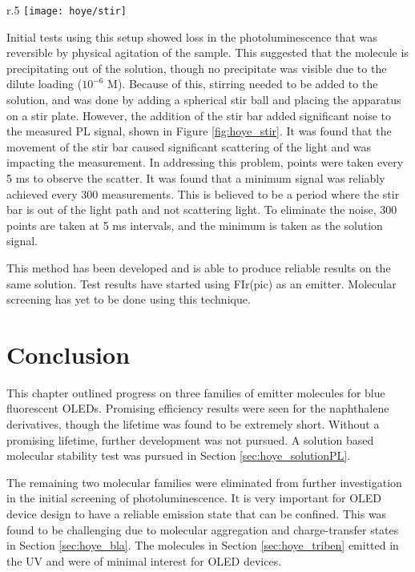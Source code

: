 \documentclass[../thesis.tex]{subfiles}
\begin{document}
\begin{wrapfigure}{r}{.5\textwidth}
\centering
\texttt{[image: hoye/stir]}
\caption{Scatter in signal when stirring.  Despite the noise, notice the constant baseline.}
\label{fig:hoye_stir}
\end{wrapfigure}

Initial tests using this setup showed loss in the photoluminescence that was reversible by physical agitation of the sample.  
This suggested that the molecule is precipitating out of the solution, though no precipitate was visible due to the dilute loading ($10^{-6}$ M).
Because of this, stirring needed to be added to the solution, and was done by adding a spherical stir ball and placing the apparatus on a stir plate.
However, the addition of the stir bar added significant noise to the measured PL signal, shown in Figure \ref{fig:hoye_stir}.
It was found that the movement of the stir bar caused significant scattering of the light and was impacting the measurement.
In addressing this problem, points were taken every 5 ms to observe the scatter.
It was found that a minimum signal was reliably achieved every 300 measurements.
This is believed to be a period where the stir bar is out of the light path and not scattering light.  
To eliminate the noise, 300 points are taken at 5 ms intervals, and the minimum is taken as the solution signal.

This method has been developed and is able to produce reliable results on the same solution.
Test results have started using FIr(pic) as an emitter.
Molecular screening has yet to be done using this technique.


\section{Conclusion}
This chapter outlined progress on three families of emitter molecules for blue fluorescent OLEDs.
Promising efficiency results were seen for the naphthalene derivatives, though the lifetime was found to be extremely short.
Without a promising lifetime, further development was not pursued.
A solution based molecular stability test was pursued in Section \ref{sec:hoye_solutionPL}.

The remaining two molecular families were eliminated from further investigation in the initial screening of photoluminescence.
It is very important for OLED device design to have a reliable emission state that can be confined.  
This was found to be challenging due to molecular aggregation and charge-transfer states in Section \ref{sec:hoye_bla}.
The molecules in Section \ref{sec:hoye_triben} emitted in the UV and were of minimal interest for OLED devices.


\end{document}
